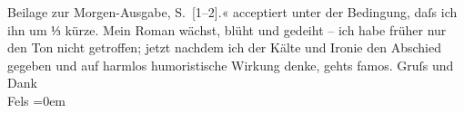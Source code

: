 \begin{ledgroupsized}[t]{13cm}
{{{                     Beilage zur Morgen-Ausgabe, S. [1–2].}}}\label{K_L00407-1h}« acceptiert unter der Bedingung, daſs ich ihn um ⅓ kürze. Mein Roman wächst,
               blüht und gedeiht – ich habe früher nur den Ton nicht getroffen; jetzt nachdem ich
               der Kälte und Ironie den Abschied gegeben und \introOben{}auf\introOben{} harmlos
               humoristische Wirkung denke, gehts famos.\pend
           \pstart
           Gruſs und Dank{\\[\baselineskip]}\spacefill\mbox{Fels}\pend
           \leftskip=0em{}
         
         \endnumbering{}\end{ledgroupsized}  \newcommand{\dateiname}{L00407}\newcommand{\titel}{Friedrich M. Fels an Arthur Schnitzler, [26. 11. 1894]}\newcommand{\editorInnen}{Martin Anton Müller und Gerd-Hermann Susen}
      